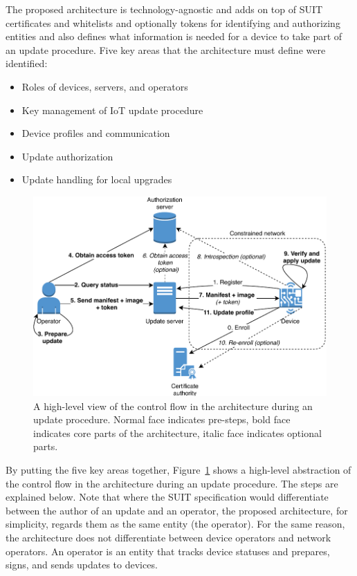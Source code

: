 \documentclass[0-thesis.tex]{subfiles}
\begin{document}
 

The proposed architecture is technology-agnostic and adds on top of SUIT certificates and
whitelists and optionally tokens for identifying and authorizing entities and also defines
what information is needed for a device to take part of an update procedure. Five key
areas that the architecture must define were identified:

\begin{itemize}
    \item Roles of devices, servers, and operators
    \item Key management of IoT update procedure
    \item Device profiles and communication
    \item Update authorization
    \item Update handling for local upgrades
\end{itemize}

\begin{figure}[t]
    \caption[A high-level view of the control flow in the architecture during an update
    procedure.]
        {A high-level view of the control flow in the architecture during an update
                procedure. Normal face indicates pre-steps, bold face indicates core parts of the architecture, italic face indicates optional parts.}
    \label{fig:communication-workflow}
    \includegraphics{images/update-flow.pdf}
\end{figure}

By putting the five key areas together, Figure~\ref{fig:communication-workflow} shows a
high-level abstraction of the control flow in the architecture during an update procedure.
The steps are explained below. Note that where the SUIT specification would differentiate
between the author of an update and an operator, the proposed architecture, for
simplicity, regards them as the same entity (the operator). For the same reason, the
architecture does not differentiate between device operators and network operators. An
operator is an entity that tracks device statuses and prepares, signs, and sends updates
to devices.
\end{document}
